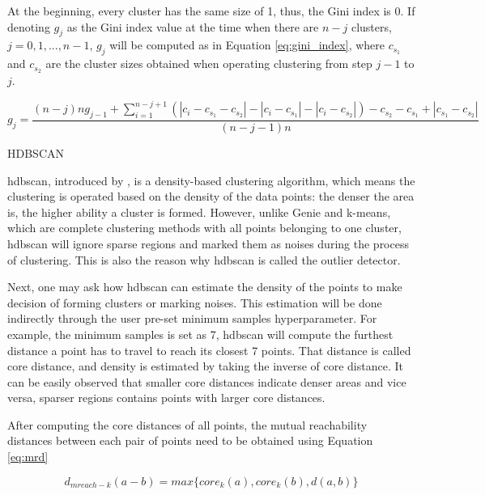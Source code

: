 \documentclass[a4paper,man,floatsintext,natbib,noextraspace]{apa6}
\makeatletter
\renewcommand{\subsubsection}{\@startsection{subsubsection}{3}
  {\z@}
  {\b@level@two@skip}
  {\e@level@two@skip}
  {\normalfont\normalsize\bfseries\itshape}}
\makeatother
\begin{document}
At the beginning, every cluster has the same size of 1, thus, the Gini index is 0. If denoting $g_{j}$ as the Gini index value at the time when there are $n − j$ clusters, $j = 0, 1, ..., n − 1$, $g_{j}$ will be computed as in Equation \eqref{eq:gini_index}, where $c_{s_{1}}$ and $c_{s_{2}}$ are the cluster sizes obtained when operating clustering from step $j-1$ to $j$.

\begin{equation}\label{eq:gini_index}
    g_{j} = \dfrac{(n-j)ng_{j-1} + \sum_{i=1}^{n-j+1} (|c_{i} - c_{s_{1}} - c_{s_{2}}| - |c_{i} - c_{s_{1}}| - |c_{i} - c_{s_{2}}|) - c_{s_{2}} - c_{s_{1}} + |c_{s_{1}} - c_{s_{2}}|}{(n-j-1)n}
\end{equation}

\subsubsection{HDBSCAN}

\gls{hdbscan}, introduced by \cite{campelloDensitybasedClusteringBased2013}, is a density-based clustering algorithm, which means the clustering is operated based on the density of the data points: the denser the area is, the higher ability a cluster is formed. However, unlike Genie and k-means, which are complete clustering methods with all points belonging to one cluster, \gls{hdbscan} will ignore sparse regions and marked them as noises during the process of clustering. This is also the reason why \gls{hdbscan} is called the outlier detector. 

Next, one may ask how \gls{hdbscan} can estimate the density of the points to make decision of forming clusters or marking noises. This estimation will be done indirectly through the user pre-set minimum samples hyperparameter. For example, the minimum samples is set as 7, \gls{hdbscan} will compute the furthest distance a point has to travel to reach its closest 7 points. That distance is called core distance, and density is estimated by taking the inverse of core distance. It can be easily observed that smaller core distances indicate denser areas and vice versa, sparser regions contains points with larger core distances.

After computing the core distances of all points, the mutual reachability distances between each pair of points need to be obtained using Equation \eqref{eq:mrd}

\begin{equation}\label{eq:mrd}
    d_{mreach-k}(a-b) = max\{core_{k}(a),core_{k}(b),d(a,b)\}
\end{equation}
\end{document}
